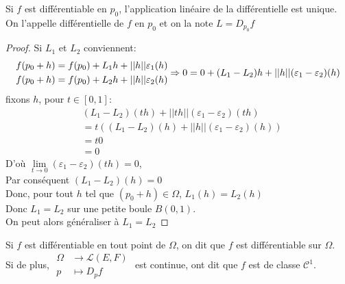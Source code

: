 \documentclass[../main.tex]{subfile}
\begin{document}
\begin{prop}
	Si $f$ est différentiable en $p_0$, l'application linéaire de la différentielle est unique. On l'appelle différentielle de $f$ en $p_0$
et on la note $L = D_{p_0} f$
\end{prop}

\begin{proof}
	Si $L_1$ et $L_2$ conviennent:
	$$
\begin{aligned}
	f(p_0+h) &= f(p_0) + L_1h + ||h||\varepsilon_1(h)\\
	f(p_0+h) &= f(p_0) + L_2h + ||h||\varepsilon_2(h)\\
\end{aligned}
	\\
	\Rightarrow 0 = 0 + (L_1- L_2)h + ||h||(\varepsilon_1 - \varepsilon_2)(h)
	$$
	fixons $h$, pour $t \in [0, 1]$:\\
	$$
\begin{aligned}
	&(L_1 - L_2)(th) + ||th||(\varepsilon_1 - \varepsilon_2)(th)\\
	&=t((L_1 - L_2)(h) + ||h||(\varepsilon_1 - \varepsilon_2)(h))\\
	&=t0\\
	&=0
\end{aligned}
$$
	D'où $\lim\limits_{t \to 0} (\varepsilon_1 - \varepsilon_2)(th) = 0$, \\
	Par conséquent $(L_1 - L_2)(h) = 0$\\
	Donc, pour tout $h$ tel que $(p_0 + h) \in \Omega$, $L_1(h) = L_2(h)$\\
	Donc $L_1 =L_2$ sur une petite boule $B(0, 1)$.\\
	On peut alors généraliser à $L_1 = L_2$
\end{proof}

\begin{defi}
	Si $f$ est différentiable en tout point de $\Omega$, on dit que $f$ est différentiable sur $\Omega$.\\
	Si de plus, $
\begin{aligned}
	\Omega &\to \mathcal{L}(E, F)\\
	p &\mapsto D_pf
\end{aligned}
	$ est continue, ont dit que $f$ est de classe $\mathcal{C}^1$.
\end{defi}
\end{document}
